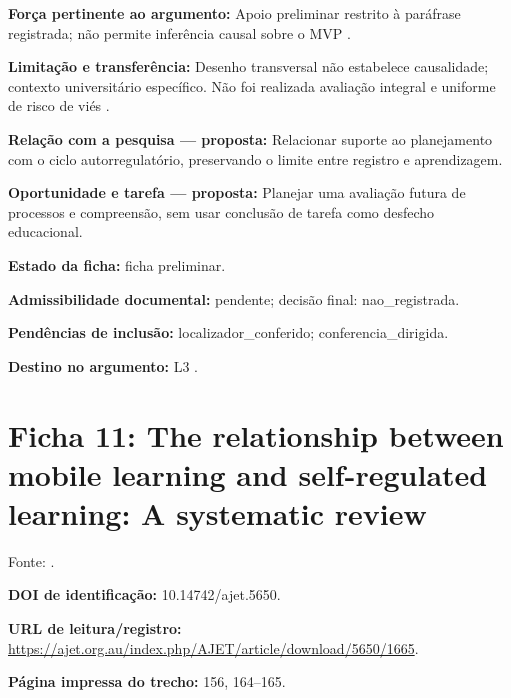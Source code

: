 \noindent\textbf{Força pertinente ao argumento:} Apoio preliminar restrito à paráfrase registrada; não permite inferência causal sobre o MVP \citep{education_limone2020}.\par\medskip

\noindent\textbf{Limitação e transferência:} Desenho transversal não estabelece causalidade; contexto universitário específico. Não foi realizada avaliação integral e uniforme de risco de viés \citep{education_limone2020}.\par\medskip

\noindent\textbf{Relação com a pesquisa — proposta:} Relacionar suporte ao planejamento com o ciclo autorregulatório, preservando o limite entre registro e aprendizagem.\par\medskip

\noindent\textbf{Oportunidade e tarefa — proposta:} Planejar uma avaliação futura de processos e compreensão, sem usar conclusão de tarefa como desfecho educacional.\par\medskip

\noindent\textbf{Estado da ficha:} ficha preliminar.\par\medskip

\noindent\textbf{Admissibilidade documental:} pendente; decisão final: nao\_registrada.\par\medskip

\noindent\textbf{Pendências de inclusão:} localizador\_conferido; conferencia\_dirigida.\par\medskip

\noindent\textbf{Destino no argumento:} L3 .

\clearpage\section*{Ficha 11: The relationship between mobile learning and self-regulated learning: A systematic review}

Fonte: \citet[p. 156, 164–165]{education_palalas2020}.

\noindent\textbf{DOI de identificação:} 10.14742/ajet.5650.\par\medskip

\noindent\textbf{URL de leitura/registro:} \url{https://ajet.org.au/index.php/AJET/article/download/5650/1665}.\par\medskip

\noindent\textbf{Página impressa do trecho:} 156, 164–165.\par\medskip


